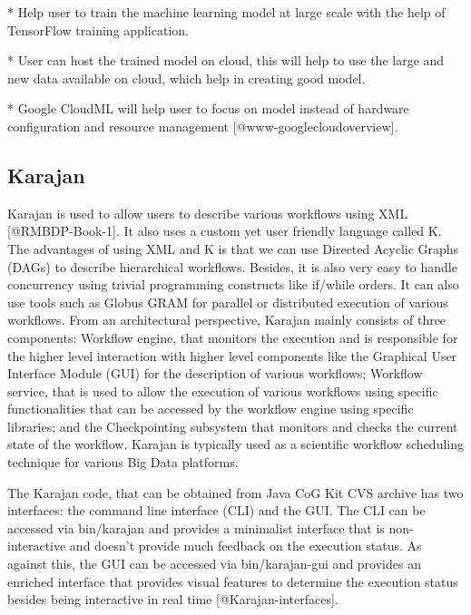 * Help user to train the machine learning model at large scale
  with the help of TensorFlow  training application.
  
* User can host the trained model on cloud,  this will help
  to use the large and new data available on cloud, which help in
  creating good model.

* Google CloudML will help user to focus on model instead of
  hardware configuration and resource
  management [@www-googlecloudoverview].

\subsection{Karajan}

Karajan is used to allow users to describe various workflows using
XML [@RMBDP-Book-1].  It also uses a custom yet user friendly
language called K.  The advantages of using XML and K is that we can
use Directed Acyclic Graphs (DAGs) to describe hierarchical workflows.
Besides, it is also very easy to handle concurrency using trivial
programming constructs like if/while orders.  It can also use tools
such as Globus GRAM for parallel or distributed execution of various
workflows.  From an architectural perspective, Karajan mainly consists
of three components: Workflow engine, that monitors the execution and
is responsible for the higher level interaction with higher level
components like the Graphical User Interface Module (GUI) for the
description of various workflows; Workflow service, that is used to
allow the execution of various workflows using specific
functionalities that can be accessed by the workflow engine using
specific libraries; and the Checkpointing subsystem that monitors and
checks the current state of the workflow.  Karajan is typically used
as a scientific workflow scheduling technique for various Big Data
platforms.

The Karajan code, that can be obtained from Java CoG Kit CVS archive
has two interfaces: the command line interface (CLI) and the GUI.  The
CLI can be accessed via bin/karajan and provides a minimalist
interface that is non-interactive and doesn't provide much feedback on
the execution status.  As against this, the GUI can be accessed via
bin/karajan-gui and provides an enriched interface that provides
visual features to determine the execution status besides being
interactive in real time [@Karajan-interfaces].



